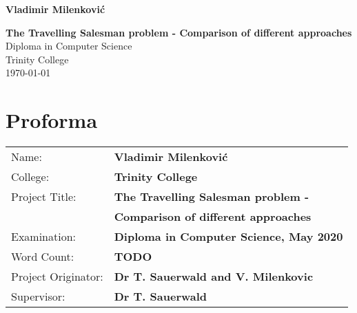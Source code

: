 \documentclass[12pt,twoside,notitlepage]{report}
\begin{document}





\pagestyle{empty}

\hfill{\LARGE \bf Vladimir Milenkovi\'c}

\vspace*{60mm}
\begin{center}
\Huge
{\bf The Travelling Salesman problem - Comparison of different approaches } \\
\vspace*{5mm}
Diploma in Computer Science \\
\vspace*{5mm}
Trinity College \\
\vspace*{5mm}
\today  %
\end{center}

\cleardoublepage


\setcounter{page}{1}
\pagestyle{plain}

\chapter*{Proforma}

{\large
\begin{tabular}{ll}
Name:               & \bf Vladimir Milenkovi\'c                  \\
College:            & \bf Trinity College                    \\
Project Title:      & \bf The Travelling Salesman problem - \\
& \bf Comparison of different approaches \\
Examination:        & \bf Diploma in Computer Science, May 2020        \\
Word Count:         & \bf TODO\footnotemark[1] \\
Project Originator: & \bf Dr T. Sauerwald and V. Milenkovic                    \\
Supervisor:         & \bf Dr T. Sauerwald                    \\ 
\end{tabular}
}
\end{document}
